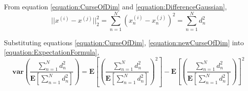 \documentclass[a4paper,12pt]{article}
\begin{document}
From equation \ref{equation:CurseOfDim} and \ref{equation:DifferenceGaussian}, 
\begin{equation}
\label{equation:newCurseOfDim}
||x^{(i)} - x^{(j)}||_{2}^{2} = \sum_{n=1}^{N} (x_{n}^{(i)} - x_{n}^{(j)})^{2} = \sum_{n=1}^{N} d_{n}^{2}
\end{equation} 

Substituting equations \ref{equation:CurseOfDim},  \ref{equation:newCurseOfDim} into \ref{equation:ExpectationFormula}, 
\begin{equation}
\label{equation:ExpandedExpectationFormula}
\mathbf{var}\left(\frac{\sum_{n=1}^{N} d_{n}^{2}}{\mathbf{E}[\sum_{n=1}^{N} d_{n}^{2}]}\right) = \mathbf{E}\left[\left(\frac{\sum_{n=1}^{N} d_{n}^{2}}{\mathbf{E}[\sum_{n=1}^{N} d_{n}^{2}]}\right)^{2}\right] - \mathbf{E}\left[\left(\frac{\sum_{n=1}^{N} d_{n}^{2}}{\mathbf{E}[\sum_{n=1}^{N} d_{n}^{2}]}\right)\right]^{2}
\end{equation} 
\end{document}
